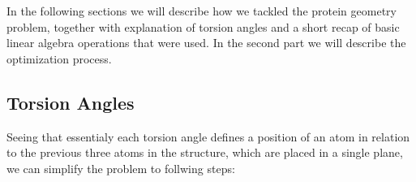 In the following sections we will describe how we tackled the protein geometry problem, together with explanation of torsion angles and a short recap of basic linear algebra operations that were used. In the second part we will describe the optimization process.

\subsection{Torsion Angles}




Seeing that essentialy each torsion angle defines a position of an atom in relation to the previous three atoms in the structure, which are placed in a single plane, we can simplify the problem to follwing steps:

